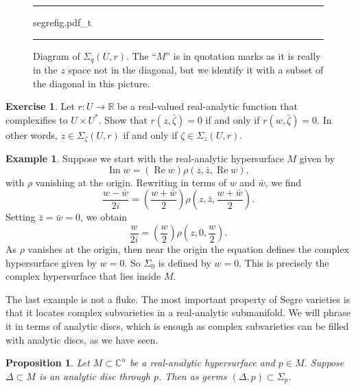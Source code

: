 \documentclass[12pt,openany]{book}
\renewcommand{\Re}{\operatorname{Re}}
\renewcommand{\Im}{\operatorname{Im}}
\newcommand{\C}{{\mathbb{C}}}
\newcommand{\R}{{\mathbb{R}}}
\theoremstyle{plain}
\newtheorem{prop}[thm]{Proposition}
\theoremstyle{remark}
\theoremstyle{definition}
\newenvironment{exbox}{%
    \def\FrameCommand{\vrule width 1pt \relax\hspace{10pt}}%
    \MakeFramed{\advance\hsize-\width\FrameRestore}%
}{%
    \endMakeFramed
}
\newenvironment{myfig}{%
\begin{figure}[h!t]
\noindent\rule{\textwidth}{0.5pt}\vspace{12pt}\par\centering}%
{\par\noindent\rule{\textwidth}{0.5pt}
\end{figure}}
\theoremstyle{exercise}
\newtheorem{exercise}{Exercise}[section]
\theoremstyle{example}
\newtheorem{example}[thm]{Example}
\begin{document}
\begin{myfig}
\medskip
{segrefig.pdf_t}
\caption{Diagram of $\Sigma_q(U,r)$.
The ``$M$'' is in quotation marks as it is really in the $z$ space not in
the diagonal, but we identify it with a subset of the diagonal in this
picture.\label{fig:segrefig}}
\end{myfig}

\begin{exbox}
\begin{exercise}
Let $r \colon U \to \R$ be a real-valued
real-analytic function that complexifies to
$U \times U^*$.  Show that
$r(z,\bar{\zeta}) = 0$
if and only if
$r(w,\bar{\zeta}) = 0$.  In other words,
$z \in \Sigma_{\zeta}(U,r)$ if and only if
$\zeta \in \Sigma_z(U,r)$.
\end{exercise}
\end{exbox}

\begin{example}
Suppose we start with the real-analytic hypersurface $M$ given by
\begin{equation*}
\Im w = (\Re w) \rho(z,\bar{z},\Re w) ,
\end{equation*}
with $\rho$ vanishing at the origin.
Rewriting in terms of $w$ and $\bar{w}$, we find
\begin{equation*}
\frac{w-\bar{w}}{2i} = \left(\frac{w+\bar{w}}{2}\right)
\rho\left(z,\bar{z},\frac{w+\bar{w}}{2}\right) .
\end{equation*}
Setting $\bar{z} = \bar{w} = 0$, we obtain
\begin{equation*}
\frac{w}{2i} = \left(\frac{w}{2}\right)
\rho\left(z,0,\frac{w}{2}\right) .
\end{equation*}
As $\rho$ vanishes at the origin, then near the origin the equation
defines the complex hypersurface given by $w=0$.
So $\Sigma_0$ is defined by $w = 0$.
This is precisely the complex hypersurface that lies inside $M$.
\end{example}

The last example is not a fluke.
The most important property of Segre varieties is that it locates complex
subvarieties in a real-analytic submanifold.
We will phrase it in terms of analytic discs, which is
enough as complex subvarieties can be filled with analytic discs,
as we have seen.

\begin{prop}
Let $M \subset \C^n$ be a real-analytic hypersurface and $p \in M$.
Suppose $\Delta \subset M$ is an analytic disc
through $p$.  Then as germs $(\Delta,p) \subset \Sigma_p$.
\end{prop}
\end{document}
